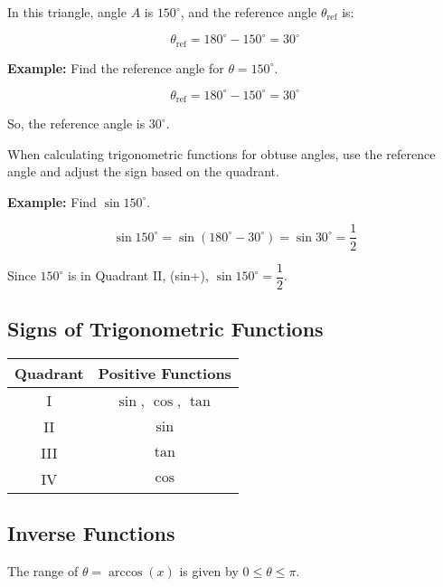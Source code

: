 \documentclass{article}
\begin{document}
\begin{multicols}{2}
\begin{center}
\end{center}

In this triangle, angle \( A \) is \(150^\circ\), and the reference angle \( \theta_{\text{ref}} \) is:

\[
\theta_{\text{ref}} = 180^\circ - 150^\circ = 30^\circ
\]

\textbf{Example:} Find the reference angle for \( \theta = 150^\circ \).

\[
\theta_{\text{ref}} = 180^\circ - 150^\circ = 30^\circ
\]

So, the reference angle is \(30^\circ\).

When calculating trigonometric functions for obtuse angles, use the reference angle and adjust the sign based on the quadrant.

\textbf{Example:} Find \(\sin 150^\circ\).

\[
\sin 150^\circ = \sin (180^\circ - 30^\circ) = \sin 30^\circ = \dfrac{1}{2}
\]

Since \(150^\circ\) is in Quadrant II, (sin+), \(\sin 150^\circ = \dfrac{1}{2}\).

\subsection*{Signs of Trigonometric Functions}
\begin{center}
\begin{tabular}{|c|c|}
\hline
Quadrant & Positive Functions \\
\hline
I & \(\sin\), \(\cos\), \(\tan\) \\
II & \(\sin\) \\
III & \(\tan\) \\
IV & \(\cos\) \\
\hline
\end{tabular}
\end{center}

\subsection*{Inverse Functions}
\noindent
The range of \(\theta = \arccos(x)\) is given by \(0 \leq \theta \leq \pi\).


\end{multicols}
\end{document}
